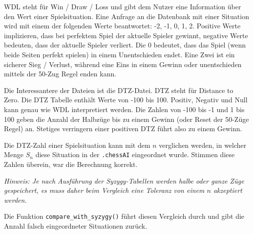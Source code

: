 \documentclass[a4paper,12pt]{article}
\begin{document}
WDL steht für Win / Draw / Loss und gibt dem Nutzer eine Information
über den Wert einer Spielsituation. Eine Anfrage an die Datenbank mit
einer Situation wird mit einem der folgenden Werte beantwortet: -2, -1,
0, 1, 2. Positive Werte implizieren, dass bei perfektem Spiel der
aktuelle Spieler gewinnt, negative Werte bedeuten, dass der aktuelle
Spieler verliert. Die 0 bedeutet, dass das Spiel (wenn beide Seiten
perfekt spielen) in einem Unentschieden endet. Eine Zwei ist ein
sicherer Sieg / Verlust, während eine Eins in einem Gewinn oder
unentschieden mittels der 50-Zug Regel enden kann.

Die Interessantere der Dateien ist die DTZ-Datei. DTZ steht für Distance
to Zero. Die DTZ Tabelle enthält Werte von -100 bis 100. Positiv,
Negativ und Null kann genau wie WDL interpretiert werden. Die Zahlen von
-100 bis -1 und 1 bis 100 geben die Anzahl der Halbzüge bis zu einem
Gewinn (oder Reset der 50-Züge Regel) an. Stetiges verringern einer
positiven DTZ führt also zu einem Gewinn.

Die DTZ-Zahl einer Spielsituation kann mit dem \(n\) verglichen werden,
in welcher Menge \(S_n\) diese Situation in der \texttt{.chessAI}
eingeordnet wurde. Stimmen diese Zahlen überein, war die Berechnung
korrekt.

\emph{Hinweis: Je nach Ausführung der Syzygy-Tabellen werden halbe oder
ganze Züge gespeichert, es muss daher beim Vergleich eine Toleranz von
einem \(n\) akzeptiert werden.}

Die Funktion \texttt{compare\_with\_syzygy()} führt diesen Vergleich
durch und gibt die Anzahl falsch eingeordneter Situationen zurück.
\end{document}
